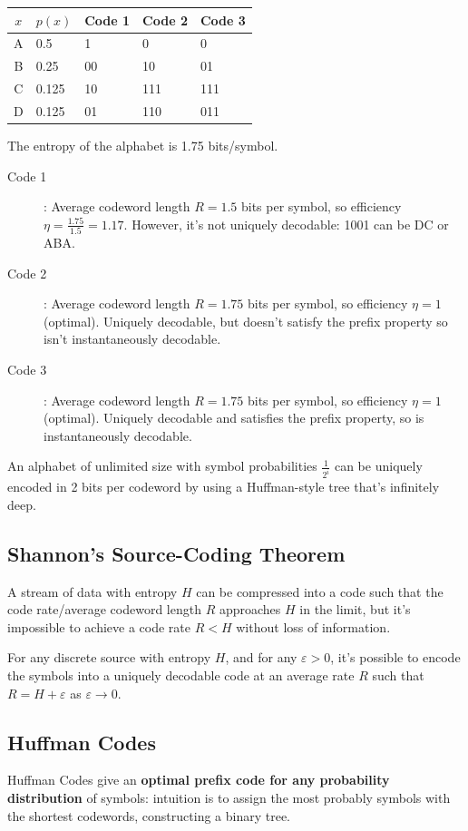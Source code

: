 \documentclass[a4paper, 11pt]{article}
\begin{document}
{{        \begin{tabular}{c | l | l | l | l}
        \(x\) & \(p(x)\) & Code 1 & Code 2 & Code 3 \\
        \hline
        A & 0.5 & 1 & 0 & 0 \\
        B & 0.25 & 00 & 10 & 01 \\
        C & 0.125 & 10 & 111 & 111 \\
        D & 0.125 & 01 & 110 & 011 \\
        \end{tabular}

        The entropy of the alphabet is 1.75 bits/symbol. 
        \begin{description}
        \item[Code 1]: Average codeword length \(R = 1.5\) bits per symbol, so efficiency \(\eta = \frac{1.75}{1.5} = 1.17\). However, it's not uniquely decodable: 1001 can be DC or ABA.
        \item[Code 2]: Average codeword length \(R = 1.75\) bits per symbol, so efficiency \(\eta = 1\) (optimal). Uniquely decodable, but doesn't satisfy the prefix property so isn't instantaneously decodable.
        \item[Code 3]: Average codeword length \(R = 1.75\) bits per symbol, so efficiency \(\eta = 1\) (optimal). Uniquely decodable and satisfies the prefix property, so is instantaneously decodable.
        \end{description}

        An alphabet of unlimited size with symbol probabilities \(\frac{1}{2^i}\) can be uniquely encoded in 2 bits per codeword by using a Huffman-style tree that's infinitely deep.
    }
    \subsection*{Shannon's Source-Coding Theorem}
    {
        A stream of data with entropy \(H\) can be compressed into a code such that the code rate/average codeword length \(R\) approaches \(H\) in the limit, but it's impossible to achieve a code rate \(R < H\) without loss of information.

        For any discrete source with entropy \(H\), and for any \(\varepsilon > 0\), it's possible to encode the symbols into a uniquely decodable code at an average rate \(R\) such that \(R = H + \varepsilon\) as \(\varepsilon \rightarrow 0\).
    }
    \subsection*{Huffman Codes}
    {
        Huffman Codes give an \textbf{optimal prefix code for any probability distribution} of symbols: intuition is to assign the most probably symbols with the shortest codewords, constructing a binary tree.

}}
\end{document}
